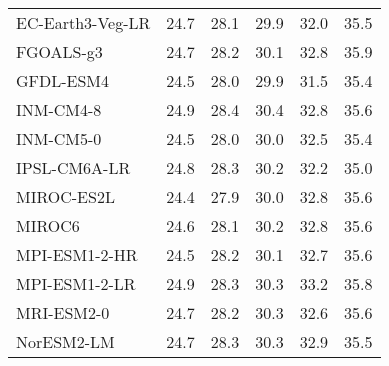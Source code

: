 \begin{table}
\begin{tabular}{lccccc}
    EC-Earth3-Veg-LR   & 24.7                         & 28.1                         & 29.9                         & 32.0                         & 35.5                         \\
    FGOALS-g3          & 24.7                         & 28.2                         & 30.1                         & 32.8                         & 35.9                         \\
    GFDL-ESM4          & 24.5                         & 28.0                         & 29.9                         & 31.5                         & 35.4                         \\
    INM-CM4-8          & 24.9                         & 28.4                         & 30.4                         & 32.8                         & 35.6                         \\
    INM-CM5-0          & 24.5                         & 28.0                         & 30.0                         & 32.5                         & 35.4                         \\
    IPSL-CM6A-LR       & 24.8                         & 28.3                         & 30.2                         & 32.2                         & 35.0                         \\
    MIROC-ES2L         & 24.4                         & 27.9                         & 30.0                         & 32.8                         & 35.6                         \\
    MIROC6             & 24.6                         & 28.1                         & 30.2                         & 32.8                         & 35.6                         \\
    MPI-ESM1-2-HR      & 24.5                         & 28.2                         & 30.1                         & 32.7                         & 35.6                         \\
    MPI-ESM1-2-LR      & 24.9                         & 28.3                         & 30.3                         & 33.2                         & 35.8                         \\
    MRI-ESM2-0         & 24.7                         & 28.2                         & 30.3                         & 32.6                         & 35.6                         \\
    NorESM2-LM         & 24.7                         & 28.3                         & 30.3                         & 32.9                         & 35.5                         \\

\end{tabular}
\end{table}
